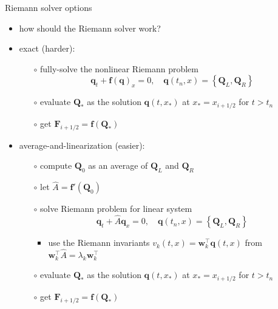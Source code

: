 \documentclass[10pt,dvipsnames,usepdftitle=false,
hyperref={pdftitle = {Finite volume methods},
    pdfauthor = {Ed Bueler}}]{beamer}
\newcommand{\bbf}{\mathbf{f}}
\newcommand{\bq}{\mathbf{q}}
\newcommand{\bw}{\mathbf{w}}
\newcommand{\bF}{\mathbf{F}}
\newcommand{\bQ}{\mathbf{Q}}
\begin{document}
\begin{frame}{Riemann solver options}

\begin{itemize}
\item how should the Riemann solver work?
\item \alert{exact (harder)}:
    \begin{itemize}
    \item[$\circ$] fully-solve the nonlinear Riemann problem
    $$\bq_t + \bbf(\bq)_x = 0, \quad \bq(t_n,x) = \left\{\bQ_L, \bQ_R\right\}$$
    \item[$\circ$] evaluate $\bQ_*$ as the solution $\bq(t,x_*)$ at $x_*=x_{i+1/2}$ for $t>t_n$
    \item[$\circ$] get $\bF_{i+1/2} = \bbf(\bQ_*)$
    \end{itemize}
\item \alert{average-and-linearization (easier)}:
    \begin{itemize}
    \item[$\circ$] compute $\bQ_0$ as an average of $\bQ_L$ and $\bQ_R$
    \item[$\circ$] let $\hat A = \bbf'(\bQ_0)$
    \item[$\circ$] solve Riemann problem for linear system
    $$\bq_t + \hat A \bq_x = 0, \quad \bq(t_n,x) = \left\{\bQ_L, \bQ_R\right\}$$

        \begin{itemize}
        \item use the Riemann invariants $v_k(t,x) = \bw_k^\top \bq(t,x)$ from $\bw_k^\top \hat A = \lambda_k \bw_k^\top$
        \end{itemize}
    \item[$\circ$] evaluate $\bQ_*$ as the solution $\bq(t,x_*)$ at $x_*=x_{i+1/2}$ for $t>t_n$
    \item[$\circ$] get $\bF_{i+1/2} = \bbf(\bQ_*)$
    \end{itemize}
\end{itemize}
\end{frame}
\end{document}
